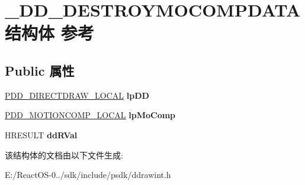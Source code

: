 \hypertarget{struct___d_d___d_e_s_t_r_o_y_m_o_c_o_m_p_d_a_t_a}{}\section{\+\_\+\+D\+D\+\_\+\+D\+E\+S\+T\+R\+O\+Y\+M\+O\+C\+O\+M\+P\+D\+A\+T\+A结构体 参考}
\label{struct___d_d___d_e_s_t_r_o_y_m_o_c_o_m_p_d_a_t_a}
\subsection*{Public 属性}
\begin{DoxyCompactItemize}
\item 
\mbox{\label{struct___d_d___d_e_s_t_r_o_y_m_o_c_o_m_p_d_a_t_a_aea26c75cc24b83a5b1417f7945f15e1c}} 
\hyperlink{struct___d_d___d_i_r_e_c_t_d_r_a_w___l_o_c_a_l}{P\+D\+D\+\_\+\+D\+I\+R\+E\+C\+T\+D\+R\+A\+W\+\_\+\+L\+O\+C\+AL} {\bfseries lp\+DD}
\item 
\mbox{\label{struct___d_d___d_e_s_t_r_o_y_m_o_c_o_m_p_d_a_t_a_af25d4623f03aa42524f0057cf875ffff}} 
\hyperlink{struct_d_d___m_o_t_i_o_n_c_o_m_p___l_o_c_a_l}{P\+D\+D\+\_\+\+M\+O\+T\+I\+O\+N\+C\+O\+M\+P\+\_\+\+L\+O\+C\+AL} {\bfseries lp\+Mo\+Comp}
\item 
\mbox{\label{struct___d_d___d_e_s_t_r_o_y_m_o_c_o_m_p_d_a_t_a_afc468cdeb25584d0b39d70b4a728293b}} 
H\+R\+E\+S\+U\+LT {\bfseries dd\+R\+Val}
\end{DoxyCompactItemize}


该结构体的文档由以下文件生成\+:\begin{DoxyCompactItemize}
\item 
E\+:/\+React\+O\+S-\/0../sdk/include/psdk/ddrawint.\+h\end{DoxyCompactItemize}
